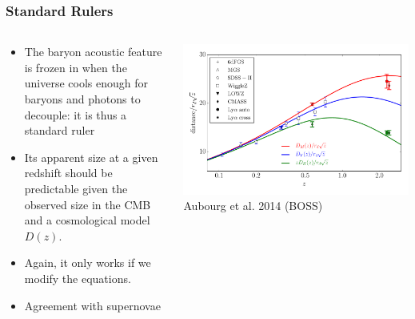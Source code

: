\documentclass{beamer}
\begin{document}
\frame
{
    \frametitle{Standard Rulers}

    \fontsize{9}{0.8\baselineskip}
    \begin{columns}
        \begin{column}{0.5\textwidth}    
            \begin{itemize}

                \item The baryon acoustic feature is frozen in when the
                    universe cools enough for baryons and photons to decouple:
                    it is thus a standard ruler

                \item Its apparent size at a given redshift should be predictable
                    given the observed size in the CMB and a cosmological model $D(z)$.

                \item Again, it only works if we modify the equations.

                \item Agreement with supernovae

            \end{itemize}
        \end{column}
        \begin{column}{0.5\textwidth}
            \begin{center}
                \includegraphics[width=\textwidth]{bao-all.pdf}
                \newline
                Aubourg et al. 2014 (BOSS)
            \end{center}
        \end{column}
    \end{columns}
}
\end{document}

